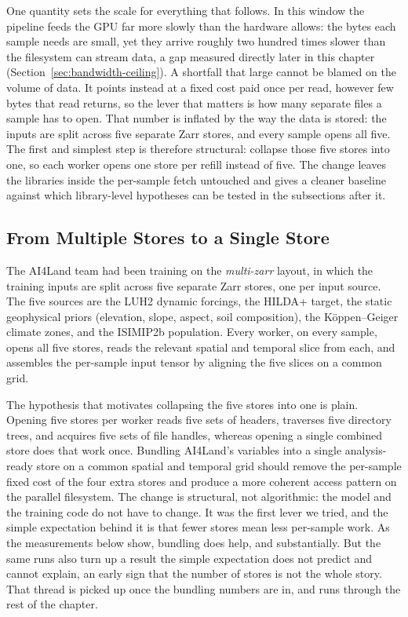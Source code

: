 \documentclass[12pt,a4paper]{article}
\begin{document}
One quantity sets the scale for everything that follows. In this window the pipeline feeds the
GPU far more slowly than the hardware allows: the bytes each sample needs are small, yet they
arrive roughly two hundred times slower than the filesystem can stream data, a gap measured
directly later in this chapter (Section~\ref{sec:bandwidth-ceiling}). A shortfall that large
cannot be blamed on the volume of data. It points instead at a fixed cost paid once per read,
however few bytes that read returns, so the lever that matters is how many separate files a
sample has to open. That number is inflated by the way the data is stored: the inputs are
split across five separate Zarr stores, and every sample opens all five. The first and
simplest step is therefore structural: collapse those five stores into one, so each worker
opens one store per refill instead of five. The change leaves the libraries inside the
per-sample fetch untouched and gives a cleaner baseline against which library-level hypotheses
can be tested in the subsections after it.

\subsection{From Multiple Stores to a Single Store}

The AI4Land team had been training on the \emph{multi-zarr} layout, in which the training
inputs are split across five separate Zarr stores, one per input source. The five sources are
the LUH2 dynamic forcings, the HILDA+ target, the static geophysical priors (elevation,
slope, aspect, soil composition), the K\"{o}ppen--Geiger climate zones, and the ISIMIP2b
population. Every worker, on every sample, opens all five stores, reads the relevant spatial
and temporal slice from each, and assembles the per-sample input tensor by aligning the five
slices on a common grid.

The hypothesis that motivates collapsing the five stores into one is plain. Opening five
stores per worker reads five sets of headers, traverses five directory trees, and acquires
five sets of file handles, whereas opening a single combined store does that work once.
Bundling AI4Land's variables into a single analysis-ready store on a common spatial and
temporal grid should remove the per-sample fixed cost of the four extra stores and produce a
more coherent access pattern on the parallel filesystem. The change is structural, not
algorithmic: the model and the training code do not have to change. It was the first lever
we tried, and the simple expectation behind it is that fewer stores mean less per-sample work.
As the measurements below show, bundling does help, and substantially. But the same runs also
turn up a result the simple expectation does not predict and cannot explain, an early sign that
the number of stores is not the whole story. That thread is picked up once the bundling numbers
are in, and runs through the rest of the chapter.
\end{document}
